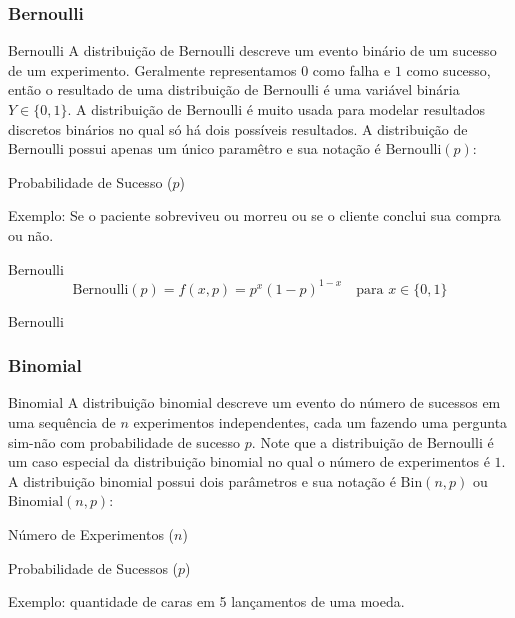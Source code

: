 \subsubsection{Bernoulli}
\begin{frame}{Bernoulli}
	A distribuição de Bernoulli descreve um evento binário de um sucesso de um experimento.
	Geralmente representamos $0$ como falha e $1$ como sucesso, então o resultado de uma distribuição de Bernoulli é
	uma variável binária $Y \in \{0, 1\}$.
	\vfill
	A distribuição de Bernoulli é muito usada para modelar resultados discretos binários no qual só há dois possíveis resultados.
	\vfill
	A distribuição de Bernoulli possui apenas um único paramêtro e sua notação é $\text{Bernoulli} (p)$:
	\begin{vfilleditems}
		\item Probabilidade de Sucesso ($p$)
	\end{vfilleditems}
	\vfill
	Exemplo: Se o paciente sobreviveu ou morreu ou se o cliente conclui sua compra ou não.
\end{frame}

\begin{frame}{Bernoulli}
	$$\text{Bernoulli}(p) = f(x, p)=p^{x}(1-p)^{1-x} \quad \text{para $x \in \{0,1\}$}$$ %
\end{frame}

\begin{frame}{Bernoulli}
	\centering
\end{frame}

\subsubsection{Binomial}
\begin{frame}{Binomial}
	A distribuição binomial descreve um evento do número de sucessos em uma sequência de $n$ experimentos independentes,
	cada um fazendo uma pergunta sim-não com probabilidade de sucesso $p$. Note que a distribuição de Bernoulli é
	um caso especial da distribuição binomial no qual o número de experimentos é $1$.
	\vfill
	A distribuição binomial possui dois parâmetros e sua notação é $\text{Bin}(n, p)$ ou $\text{Binomial}(n, p)$:
	\begin{vfilleditems}
		\item Número de Experimentos ($n$)
		\item Probabilidade de Sucessos ($p$)
	\end{vfilleditems}
	\vfill
	Exemplo: quantidade de caras em 5 lançamentos de uma moeda.
\end{frame}

